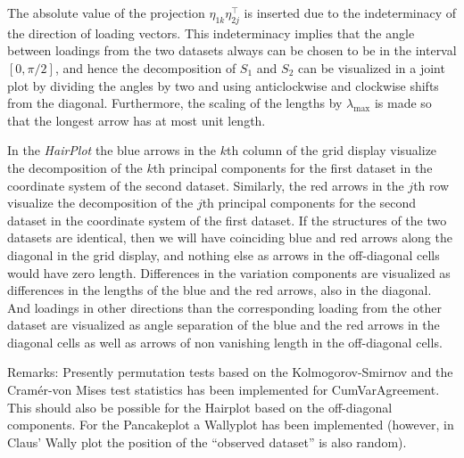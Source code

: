 \documentclass[titlepage,11pt,twoside]{article}
\begin{document}
The absolute value of the projection $\eta_{1k} \eta_{2j}^\top$ is inserted due to the indeterminacy of the direction of loading vectors. This indeterminacy implies that the angle between loadings from the two datasets always can be chosen to be in the interval $[0,\pi/2]$, and hence the decomposition of $S_1$ and $S_2$ can be visualized in a joint plot by dividing the angles by two and using anticlockwise and clockwise shifts from the diagonal. Furthermore, the scaling of the lengths by $\lambda_{\max}$ is made so that the longest arrow has at most unit length.

In the \emph{HairPlot} the blue arrows in the $k$th column of the grid display visualize the decomposition of the $k$th principal components for the first dataset in the coordinate system of the second dataset. Similarly, the red arrows in the $j$th row visualize the decomposition of the $j$th principal components for the second dataset in the coordinate system of the first dataset. If the structures of the two datasets are identical, then we will have coinciding blue and red arrows along the diagonal in the grid display, and nothing else as arrows in the off-diagonal cells would have zero length. Differences in the variation components are visualized as differences in the lengths of the blue and the red arrows, also in the diagonal. And loadings in other directions than the corresponding loading from the other dataset are visualized as angle separation of the blue and the red arrows in the diagonal cells as well as arrows of non vanishing length in the off-diagonal cells.



\bigskip

Remarks: Presently permutation tests based on the Kolmogorov-Smirnov and the Cram\'er-von Mises test statistics has been implemented for CumVarAgreement. This should also be possible for the Hairplot based on the off-diagonal components. For the Pancakeplot a Wallyplot has been implemented (however, in Claus' Wally plot the position of the ``observed dataset'' is also random).

\bigskip
\end{document}
